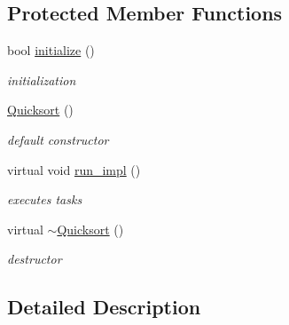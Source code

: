 \subsection*{Protected Member Functions}
\begin{DoxyCompactItemize}
\item 
\hypertarget{classhryky_1_1task_1_1worker_1_1_quicksort_a2f82a35614b7daa8948dc5856dc64b0d}{bool \hyperlink{classhryky_1_1task_1_1worker_1_1_quicksort_a2f82a35614b7daa8948dc5856dc64b0d}{initialize} ()}\label{classhryky_1_1task_1_1worker_1_1_quicksort_a2f82a35614b7daa8948dc5856dc64b0d}

\begin{DoxyCompactList}\small\item\em initialization \end{DoxyCompactList}\item 
\hypertarget{classhryky_1_1task_1_1worker_1_1_quicksort_af065760a86205148c6d2a70dd1cbf08e}{\hyperlink{classhryky_1_1task_1_1worker_1_1_quicksort_af065760a86205148c6d2a70dd1cbf08e}{Quicksort} ()}\label{classhryky_1_1task_1_1worker_1_1_quicksort_af065760a86205148c6d2a70dd1cbf08e}

\begin{DoxyCompactList}\small\item\em default constructor \end{DoxyCompactList}\item 
virtual void \hyperlink{group__task_ga1f7366c2252fb0c7a7c8dc6f92a31e88}{run\-\_\-impl} ()
\begin{DoxyCompactList}\small\item\em executes tasks \end{DoxyCompactList}\item 
\hypertarget{classhryky_1_1task_1_1worker_1_1_quicksort_aeebf7ccb7a536109be5af4c5069bedfd}{virtual \hyperlink{classhryky_1_1task_1_1worker_1_1_quicksort_aeebf7ccb7a536109be5af4c5069bedfd}{$\sim$\-Quicksort} ()}\label{classhryky_1_1task_1_1worker_1_1_quicksort_aeebf7ccb7a536109be5af4c5069bedfd}

\begin{DoxyCompactList}\small\item\em destructor \end{DoxyCompactList}\end{DoxyCompactItemize}


\subsection{Detailed Description}
